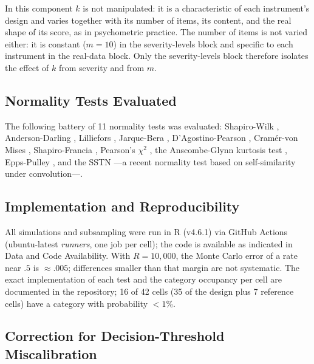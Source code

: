\documentclass[man,mask,donotrepeattitle,floatsintext]{apa7}
\begin{document}
In this component $k$ is not manipulated: it is a characteristic of each instrument's design and varies together with its number of items, its content, and the real shape of its score, as in psychometric practice. The number of items is not varied either: it is constant ($m=10$) in the severity-levels block and specific to each instrument in the real-data block. Only the severity-levels block therefore isolates the effect of $k$ from severity and from $m$.

\subsection{Normality Tests Evaluated}
\label{sec:tests}

The following battery of 11 normality tests was evaluated: Shapiro-Wilk \parencite{shapirowilk1965}, Anderson-Darling \parencite{andersondarling1954}, Lilliefors \parencite{lilliefors1967}, Jarque-Bera \parencite{jarquebera1980}, D'Agostino-Pearson \parencite{dagostinopearson1973}, Cramér-von Mises \parencite{csorgofaraway1996}, Shapiro-Francia \parencite{shapirofrancia1972}, Pearson's $\chi^2$ \parencite{pearson1900}, the Anscombe-Glynn kurtosis test \parencite{anscombeglynn1983}, Epps-Pulley \parencite{eppspulley1983}, and the SSTN \parencite{anaratschwender2026} ---a recent normality test based on self-similarity under convolution---.

\subsection{Implementation and Reproducibility}
\label{sec:implementation}

All simulations and subsampling were run in R (v4.6.1) via GitHub Actions (ubuntu-latest \emph{runners}, one job per cell); the code is available as indicated in Data and Code Availability. With $R=10,000$, the Monte Carlo error of a rate near $.5$ is $\approx.005$; differences smaller than that margin are not systematic. The exact implementation of each test and the category occupancy per cell are documented in the repository; 16 of 42 cells (35 of the design plus 7 reference cells) have a category with probability $<1\%$.

\subsection{Correction for Decision-Threshold Miscalibration}
\label{sec:correccion}
\end{document}
